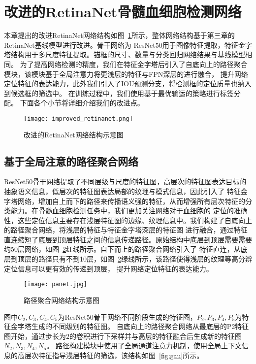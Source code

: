 \section{改进的RetinaNet骨髓血细胞检测网络}
本章提出的改进RetinaNet网络结构如图~\ref{fig:improved_retinanet}所示，整体网络结构基于第三章的RetinaNet基线模型进行改进。骨干网络为
ResNet50用于图像特征提取，特征金字塔结构用于多尺度特征提取。锚框的尺寸、数量与分类回归网络结果与基线模型相同。
为了提高网络检测的精度，我们在特征金字塔后引入了自底向上的路径聚合模块，该模块基于全局注意力将更浅层的特征与FPN深层的进行融合，
提升网络定位特征的表达能力，此外我们引入了IOU预测分支，将检测框的定位质量也纳入到候选框的筛选中。
在训练过程中，我们使用基于最优输运的策略进行标签分配。
下面各个小节将详细介绍我们的改进点。
\begin{figure}[htbp]                     
  \centering                      
  \texttt{[image: improved\_retinanet.png]}                      
  \caption{改进的RetinaNet网络结构示意图}                      
  \label{fig:improved_retinanet}       
\end{figure}  

\subsection{基于全局注意的路径聚合网络}
ResNet50骨干网络提取了不同层级与尺度的特征图，高层次的特征图表达目标的抽象语义信息，低层次的特征图表达局部的纹理与模式信息，因此引入了
特征金字塔网络，增加自上而下的路径来传播语义强的特征，从而增强所有层次特征的分类能力。在骨髓血细胞检测任务中，我们更加关注网络对于血细胞的
定位的准确性，这些定位信息主要存在浅层特征图的边缘、纹理信息中。我们构建了自底向上的路径聚合网络，将浅层的特征与特征金字塔深层的特征图
进行融合，通过特征直连缩短了底层到顶层特征之间的信息传递路径。原始结构中底层到顶层需要需要约50层网络，如图~\ref{fig:panet}红线所示。自下而上的路径聚合网络引入了
特征直连，从底层到顶层的路径只有不到10层，如图~\ref{fig:panet}绿线所示，该路径使得浅层的纹理等高分辨定位信息可以更有效的传递到顶层，
提升网络定位特征的表达能力。
\begin{figure}[htbp]                     
  \centering                      
  \texttt{[image: panet.jpg]}                      
  \caption{路径聚合网络结构示意图}                      
  \label{fig:panet}       
\end{figure}  

图中${C_2, C_3, C_4, C_5}$为ResNet50骨干网络不同阶段生成的特征图，${P_2, P_3, P_4, P_5}$为特征金字塔生成的不同级别的特征图。
自底向上的路径聚合网络从最底层的P2特征图开始，通过步长为2的卷积进行下采样并与高层的特征融合后生成新的特征图${N_2, N_3, N_4, N_5}$。
路径构建模块中使用了全局通道注意力机制\cite{li2018pyramid}，使用全局上下文信息的高层次特征指导浅层特征的筛选，该结构如图~\ref{fig:gau}所示。

